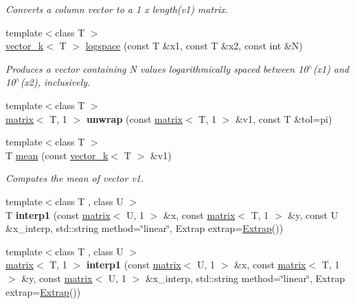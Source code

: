 \begin{DoxyCompactItemize}
\begin{DoxyCompactList}\small\item\em Converts a column vector to a 1 x length(v1) matrix. \end{DoxyCompactList}\item 
{\footnotesize template$<$class T $>$ }\\\hyperlink{classkeycpp_1_1vector__k}{vector\-\_\-k}$<$ T $>$ \hyperlink{namespacekeycpp_a9e1c37fd71074c56e963be121e5de0f3}{logspace} (const T \&x1, const T \&x2, const int \&N)
\begin{DoxyCompactList}\small\item\em Produces a vector containing N values logarithmically spaced between 10$^\wedge$(x1) and 10$^\wedge$(x2), inclusively. \end{DoxyCompactList}\item 
\hypertarget{namespacekeycpp_ae471c1edede10cab9baaa3f97b79f9fe}{{\footnotesize template$<$class T $>$ }\\\hyperlink{classkeycpp_1_1matrix}{matrix}$<$ T, 1 $>$ {\bfseries unwrap} (const \hyperlink{classkeycpp_1_1matrix}{matrix}$<$ T, 1 $>$ \&v1, const T \&tol=pi)}\label{namespacekeycpp_ae471c1edede10cab9baaa3f97b79f9fe}

\item 
\hypertarget{namespacekeycpp_ae2909bfb67450be6a6d53a62752a2106}{{\footnotesize template$<$class T $>$ }\\T \hyperlink{namespacekeycpp_ae2909bfb67450be6a6d53a62752a2106}{mean} (const \hyperlink{classkeycpp_1_1vector__k}{vector\-\_\-k}$<$ T $>$ \&v1)}\label{namespacekeycpp_ae2909bfb67450be6a6d53a62752a2106}

\begin{DoxyCompactList}\small\item\em Computes the mean of vector v1. \end{DoxyCompactList}\item 
\hypertarget{namespacekeycpp_a69cb099fd0d2482617127385c7de7a06}{{\footnotesize template$<$class T , class U $>$ }\\T {\bfseries interp1} (const \hyperlink{classkeycpp_1_1matrix}{matrix}$<$ U, 1 $>$ \&x, const \hyperlink{classkeycpp_1_1matrix}{matrix}$<$ T, 1 $>$ \&y, const U \&x\-\_\-interp, std\-::string method=\char`\"{}linear\char`\"{}, Extrap extrap=\hyperlink{classkeycpp_1_1_extrap}{Extrap}())}\label{namespacekeycpp_a69cb099fd0d2482617127385c7de7a06}

\item 
\hypertarget{namespacekeycpp_a378d96774bbc4017e0bd39ccfed82e5d}{{\footnotesize template$<$class T , class U $>$ }\\\hyperlink{classkeycpp_1_1matrix}{matrix}$<$ T, 1 $>$ {\bfseries interp1} (const \hyperlink{classkeycpp_1_1matrix}{matrix}$<$ U, 1 $>$ \&x, const \hyperlink{classkeycpp_1_1matrix}{matrix}$<$ T, 1 $>$ \&y, const \hyperlink{classkeycpp_1_1matrix}{matrix}$<$ U, 1 $>$ \&x\-\_\-interp, std\-::string method=\char`\"{}linear\char`\"{}, Extrap extrap=\hyperlink{classkeycpp_1_1_extrap}{Extrap}())}\label{namespacekeycpp_a378d96774bbc4017e0bd39ccfed82e5d}


\end{DoxyCompactItemize}
